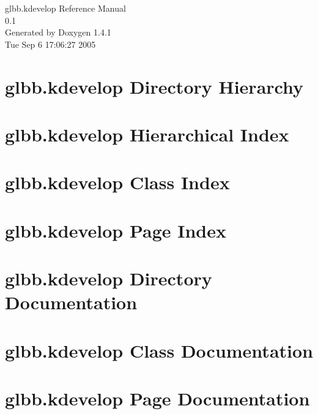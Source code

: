 \documentclass[a4paper]{book}
\begin{document}
\begin{titlepage}
\vspace*{7cm}
\begin{center}
{\Large glbb.kdevelop Reference Manual\\[1ex]\large 0.1 }\\
\vspace*{1cm}
{\large Generated by Doxygen 1.4.1}\\
\vspace*{0.5cm}
{\small Tue Sep 6 17:06:27 2005}\\
\end{center}
\end{titlepage}
\clearemptydoublepage
{}
\tableofcontents
\clearemptydoublepage
{}
\chapter{glbb.kdevelop Directory Hierarchy}

\chapter{glbb.kdevelop Hierarchical Index}

\chapter{glbb.kdevelop Class Index}

\chapter{glbb.kdevelop Page Index}

\chapter{glbb.kdevelop Directory Documentation}


\chapter{glbb.kdevelop Class Documentation}





















\chapter{glbb.kdevelop Page Documentation}

\printindex
\end{document}
